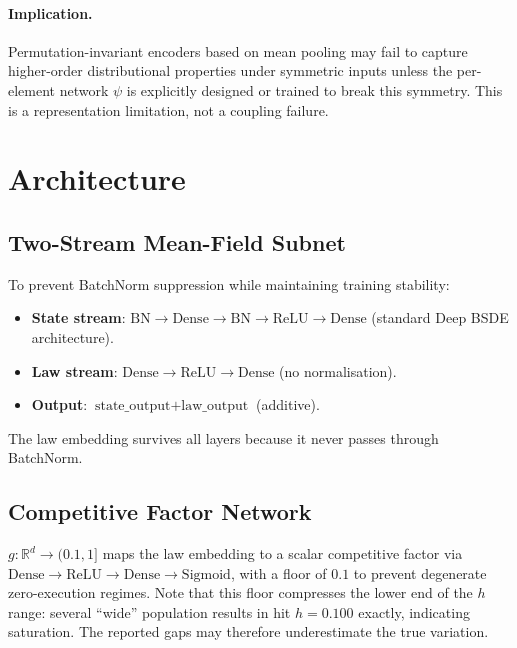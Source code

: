 \documentclass[11pt,a4paper]{article}
\newcommand{\R}{\mathbb{R}}
\begin{document}
\paragraph{Implication.} Permutation-invariant encoders based on mean pooling may fail to capture higher-order distributional properties under symmetric inputs unless the per-element network $\psi$ is explicitly designed or trained to break this symmetry. This is a representation limitation, not a coupling failure.

\section{Architecture}
\label{sec:architecture}

\subsection{Two-Stream Mean-Field Subnet}

To prevent BatchNorm suppression while maintaining training stability:
\begin{itemize}
  \item \textbf{State stream}: $\text{BN} \to \text{Dense} \to \text{BN} \to \text{ReLU} \to \text{Dense}$ (standard Deep BSDE architecture).
  \item \textbf{Law stream}: $\text{Dense} \to \text{ReLU} \to \text{Dense}$ (no normalisation).
  \item \textbf{Output}: $\text{state\_output} + \text{law\_output}$ (additive).
\end{itemize}

The law embedding survives all layers because it never passes through BatchNorm.

\subsection{Competitive Factor Network}

$g: \R^d \to (0.1, 1]$ maps the law embedding to a scalar competitive factor via $\text{Dense} \to \text{ReLU} \to \text{Dense} \to \text{Sigmoid}$, with a floor of $0.1$ to prevent degenerate zero-execution regimes. Note that this floor compresses the lower end of the $h$ range: several ``wide'' population results in  hit $h = 0.100$ exactly, indicating saturation. The reported gaps may therefore underestimate the true variation.
\end{document}
